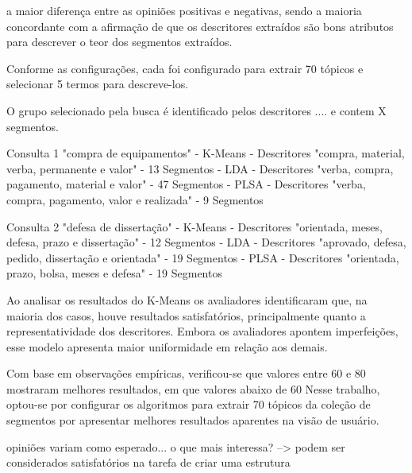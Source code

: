 a maior diferença entre as opiniões positivas e negativas, sendo a maioria concordante com a afirmação de que os descritores extraídos são bons atributos para descrever o teor dos segmentos extraídos.








Conforme as configurações, cada foi configurado para extrair 70 tópicos e selecionar 5 termos para descreve-los. 

O grupo selecionado pela busca é identificado pelos descritores .... e contem X segmentos.

Consulta 1 "compra de equipamentos"
	- K-Means 
		- Descritores "compra, material, verba, permanente e valor"
		- 13 Segmentos
	- LDA
		- Descritores "verba, compra, pagamento, material e valor"
		- 47 Segmentos
	- PLSA
		- Descritores "verba, compra, pagamento, valor e realizada"
		- 9 Segmentos

Consulta 2 "defesa de dissertação"
	- K-Means 
		- Descritores "orientada, meses, defesa, prazo e dissertação"
		- 12 Segmentos
	- LDA
		- Descritores "aprovado, defesa, pedido, dissertação e orientada"
		- 19 Segmentos
	- PLSA
		- Descritores "orientada, prazo, bolsa, meses e defesa"
		- 19 Segmentos









Ao analisar os resultados do K-Means os avaliadores identificaram que, na maioria dos casos, houve resultados satisfatórios, principalmente quanto a representatividade dos descritores. Embora os avaliadores apontem imperfeições, esse modelo apresenta maior uniformidade em relação aos demais.


Com base em observações empíricas, verificou-se que valores entre 60 e 80 mostraram melhores resultados, em que valores abaixo de 60 Nesse trabalho, optou-se por configurar os algoritmos para extrair 70 tópicos da coleção de segmentos por apresentar melhores resultados aparentes na visão de usuário.



opiniões variam como esperado...
o que mais interessa?
--> podem ser considerados satisfatórios na tarefa de criar uma estrutura 

